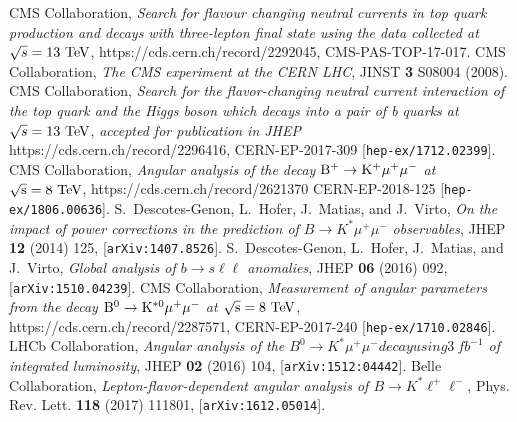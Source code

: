 \documentclass{PoS}
\begin{document}
\begin{thebibliography}{99}

  CMS Collaboration,
  \emph{Search for flavour changing neutral currents in top quark production and decays with three-lepton final state using the data collected at $\sqrt{s} = 13~{\rm TeV}$},
  https://cds.cern.ch/record/2292045, CMS-PAS-TOP-17-017.
  CMS Collaboration,
  \emph{The CMS experiment at the CERN LHC},
  JINST {\bf 3} S08004 (2008).
  CMS Collaboration,
  \emph{Search for the flavor-changing neutral current interaction of the top quark and the Higgs boson which decays into a pair of b quarks at $\sqrt{s} = 13~{\rm TeV}$},
  \emph{accepted for publication in JHEP}
  https://cds.cern.ch/record/2296416, CERN-EP-2017-309
  [{\tt hep-ex/1712.02399}].
  CMS Collaboration,
  \emph{Angular analysis of the decay ${\rm B^+ \to K^+\mu^+\mu^-}$ at ${\rm \sqrt{s} = 8~TeV}$},
  https://cds.cern.ch/record/2621370 CERN-EP-2018-125
  [{\tt hep-ex/1806.00636}].
  S.~Descotes-Genon, L.~Hofer, J.~Matias, and J.~Virto,
  \emph{On the impact of power corrections in the prediction of $B \to K^*\mu^+\mu^-$ observables},
  JHEP {\bf 12} (2014) 125, [{\tt arXiv:1407.8526}].
  S.~Descotes-Genon, L.~Hofer, J.~Matias, and J.~Virto,
  \emph{Global analysis of $b \to s\ell\ell$ anomalies},
  JHEP {\bf 06} (2016) 092, [{\tt arXiv:1510.04239}].
  CMS Collaboration,
  \emph{Measurement of angular parameters from the decay ${\rm B^0 \to K^{*0}\mu^+\mu^-}$ at ${\rm \sqrt{s} = 8~TeV}$},
  https://cds.cern.ch/record/2287571, CERN-EP-2017-240
  [{\tt hep-ex/1710.02846}].  
  LHCb Collaboration,
  \emph{Angular analysis of the $B^0 \to K^*\mu^+\mu^- decay using 3~fb^{-1}$ of integrated luminosity},
  JHEP {\bf 02} (2016) 104, [{\tt arXiv:1512:04442}].
  Belle Collaboration,
  \emph{Lepton-flavor-dependent angular analysis of $B \to K^* \ell^+\ell^-$},
  Phys. Rev. Lett. {\bf 118} (2017) 111801, [{\tt arXiv:1612.05014}].
\end{thebibliography}
\end{document}

